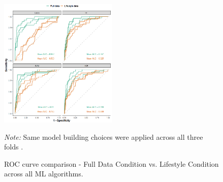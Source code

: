 \begin{figure}[htbp]
\sf\centering
\caption{ROC curve comparison - Full Data Condition vs. Lifestyle Condition across all ML algorithms.}
\includegraphics[width=0.5\textwidth]{Figures/ROC_compare_folds_rs.png}
\vspace{0.25cm}
  \parbox{0.45\textwidth}{\small{\textit{Note:} Same model building choices were applied across all three folds .}}
\label{fig:roc_curves}
\end{figure}